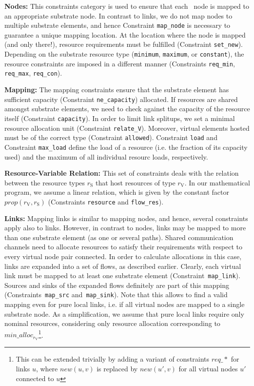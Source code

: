 \documentclass[conference,10pt]{IEEEtran}
\newcommand{\CloudNet}{\text{CloudNet}}
\newcommand{\mrm}{\mathrm}
\begin{document}
\begin{description*}
\item \textbf{Nodes:} This constraints category is used to ensure that each \CloudNet\
  node is mapped to an appropriate substrate node. In contrast to
  links, we do not map nodes to multiple substrate elements, and hence
  Constraint \texttt{map\_node} is necessary to guarantee a unique mapping
  location. At the location where the node is mapped (and only there!),
  resource requirements must be fulfilled (Constraint
  \texttt{set\_new}). Depending on the substrate resource type
  (\texttt{minimum}, \texttt{maximum}, or \texttt{constant}), the resource
  constraints are imposed in a different manner (Constraints
  \texttt{req\_min}, \texttt{req\_max}, \texttt{req\_con}).

\item \textbf{Mapping:} The mapping constraints ensure that the substrate element has
  sufficient capacity (Constraint \texttt{ne\_capacity}) allocated.
  If resources are shared amongst substrate elements, we need to check against the capacity of the resource itself (Constraint \texttt{capacity}).
  In order to limit link splitups, we set a minimal resource allocation unit (Constraint \texttt{relate\_V}).
  Moreover, virtual elements hosted must be of the correct type
  (Constraint \texttt{allowed}).
Constraint \texttt{load} and Constraint
  \texttt{max\_load} define the load of a resource (i.e. the fraction of its capacity used)
and the maximum of all individual resourc
  loads, respectively.

\item \textbf{Resource-Variable Relation:} This set of constraints deals with the
  relation between the resource types $r_\mrm{S}$ that host resources of type $r_\mrm{V}$.
  In our mathematical program, we assume a linear relation, which is given by
  the constant factor $prop(r_\mrm{V},r_\mrm{S})$ (Constraints \texttt{resource} and \texttt{flow\_res}).
\item \textbf{Links:} Mapping links is similar to mapping nodes, and hence, several
  constraints apply also to links.
  However, in contrast to nodes, links may be mapped to more than one substrate element (as one or several paths).
  Shared communication channels need to allocate resources to satisfy their requirements with respect to every virtual node pair connected.
  In order to calculate allocations in this case, links are expanded into a set of flows, as described earlier.
  Clearly, each virtual link must be mapped to at least one substrate element
  (Constraint~\texttt{map\_link}).
  Sources and sinks of the expanded flows definitely are part of this mapping
(Constraints~\texttt{map\_src} and~\texttt{map\_sink}).
  Note that this allows to find a valid mapping even for pure local links, i.e. if all virtual nodes are mapped to a single substrate node.
  As a simplification, we assume that pure local links require only nominal resources, considering only resource allocation corresponding to $min\_alloc_{r_\mrm{V}}$\footnote{This can be extended trivially by adding a variant of constraints $req\_*$ for links $u$, where $new(u,v)$ is replaced by $new(u',v)$ for all virtual nodes $u'$ connected to $u$}.


\end{description*}
\end{document}
